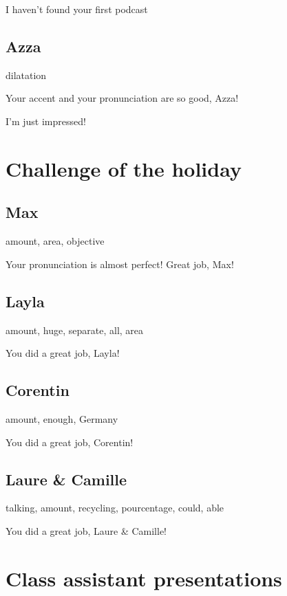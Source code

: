 \documentclass[12pt,oneside]{report}
\begin{document}
\begin{spacing}{1.2}
I haven't found your first podcast


\subsection*{Azza}

dilatation

Your accent and your pronunciation are so good, Azza!

I'm just impressed!



\section{Challenge of the holiday}

\subsection*{Max}

amount, area, objective

Your pronunciation is almost perfect! Great job, Max!

\subsection*{Layla}

amount, huge, separate, all, area

You did a great job, Layla!


\subsection*{Corentin}

amount, enough, Germany

You did a great job, Corentin!

\subsection*{Laure \& Camille}

talking, amount, recycling, pourcentage, could, able

You did a great job, Laure \& Camille!


\section{Class assistant presentations}




\end{spacing}
\end{document}
